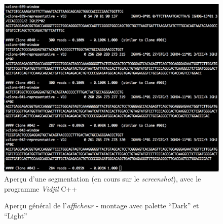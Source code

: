 \documentclass[12pt]{report}
\begin{document}
\begin{spacing}{1.2}

\begin{figure}[h!]
\begin{center}
	\includegraphics[scale=0.6]{img/C++-Ex.jpg}
\end{center}
\caption{Aperçu d'une segmentation (en cours sur le \textit{screenshot}), avec le programme \textit{Vidjil} C++}
\end{figure}

\begin{figure}
\begin{center}
\end{center}
\caption{Aperçu général de l'\textit{afficheur} - montage avec palette ``Dark'' et ``Light''}
\end{figure}


\end{spacing}
\end{document}
